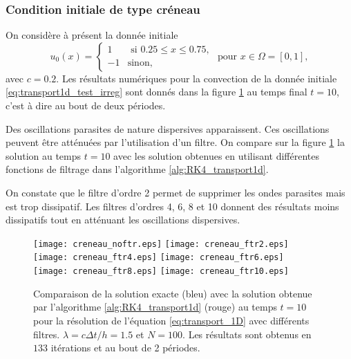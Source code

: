 \subsubsection{Condition initiale de type créneau}

On considère à présent la donnée initiale
\begin{equation}
u_0(x) = \left\lbrace
\begin{array}{rl}
1 & \text{ si } 0.25 \leq x \leq 0.75, \\
-1 & \text{sinon,}
\end{array}
\right.
\text{ pour } x \in \Omega = [0,1],
\label{eq:transport1d_test_irreg}
\end{equation}
avec $c=0.2$. Les résultats numériques pour la convection de la donnée initiale \eqref{eq:transport1d_test_irreg} sont donnés dans la figure \ref{fig:comp_ireg} au temps final $t=10$, c'est à dire au bout de deux périodes.

Des oscillations parasites de nature dispersives apparaissent. Ces oscillations peuvent être atténuées par l'utilisation d'un filtre. On compare sur la figure \ref{fig:comp_ireg} la solution au temps $t=10$ avec les solution obtenues en utilisant différentes fonctions de filtrage dans l'algorithme \ref{alg:RK4_transport1d}.

On constate que le filtre d'ordre 2 permet de supprimer les ondes parasites mais est trop dissipatif. Les filtres d'ordres 4, 6, 8 et 10 donnent des résultats moins dissipatifs tout en atténuant les oscillations dispersives.

\begin{figure}[htbp]
\begin{center}
\texttt{[image: creneau\_noftr.eps]}
\texttt{[image: creneau\_ftr2.eps]}\\
\texttt{[image: creneau\_ftr4.eps]}
\texttt{[image: creneau\_ftr6.eps]}\\
\texttt{[image: creneau\_ftr8.eps]}
\texttt{[image: creneau\_ftr10.eps]}\\
\end{center}
\caption{Comparaison de la solution exacte (bleu) avec la solution obtenue par l'algorithme \ref{alg:RK4_transport1d} (rouge) au temps $t=10$ pour la résolution de l'équation \eqref{eq:transport_1D} avec différents filtres. $\lambda = c \Delta t / h = 1.5$ et $N=100$. Les résultats sont obtenus en $133$ itérations et au bout de 2 périodes.}
\label{fig:comp_ireg}
\end{figure}

